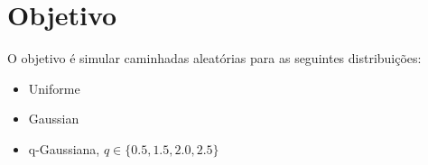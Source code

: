 
\section{Objetivo}

O objetivo é simular caminhadas aleatórias para as seguintes distribuições:

\begin{itemize}
  \item Uniforme
  \item Gaussian
  \item q-Gaussiana, $q \in \{ 0.5, 1.5, 2.0, 2.5 \}$
\end{itemize}
